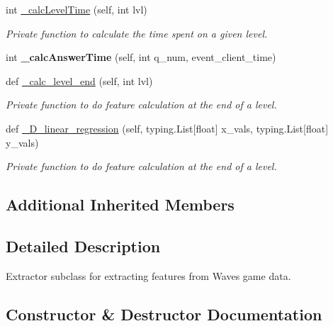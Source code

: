 \begin{DoxyCompactItemize}
int \mbox{\hyperlink{classfeature__extractors_1_1_wave_extractor_1_1_wave_extractor_a3f90f055668095294fd59984e43c11ff}{\+\_\+calc\+Level\+Time}} (self, int lvl)
\begin{DoxyCompactList}\small\item\em Private function to calculate the time spent on a given level. \end{DoxyCompactList}\item 
\mbox{\label{classfeature__extractors_1_1_wave_extractor_1_1_wave_extractor_adc98a43d4cd154ff1aec09b3ff04e8a5}} 
int {\bfseries \+\_\+calc\+Answer\+Time} (self, int q\+\_\+num, event\+\_\+client\+\_\+time)
\item 
def \mbox{\hyperlink{classfeature__extractors_1_1_wave_extractor_1_1_wave_extractor_ab6c939253dae530a4e3b5c13e160e5df}{\+\_\+calc\+\_\+level\+\_\+end}} (self, int lvl)
\begin{DoxyCompactList}\small\item\em Private function to do feature calculation at the end of a level. \end{DoxyCompactList}\item 
def \mbox{\hyperlink{classfeature__extractors_1_1_wave_extractor_1_1_wave_extractor_a7b01d3d7fe641a767a4e68f2a6b2808f}{\+\_\+D\+\_\+linear\+\_\+regression}} (self, typing.\+List\mbox{[}float\mbox{]} x\+\_\+vals, typing.\+List\mbox{[}float\mbox{]} y\+\_\+vals)
\begin{DoxyCompactList}\small\item\em Private function to do feature calculation at the end of a level. \end{DoxyCompactList}\end{DoxyCompactItemize}
\subsection*{Additional Inherited Members}


\subsection{Detailed Description}
Extractor subclass for extracting features from Waves game data. 



\subsection{Constructor \& Destructor Documentation}
\mbox{\label{classfeature__extractors_1_1_wave_extractor_1_1_wave_extractor_ad2acd3dec60e43803dc2d5cc49cda58e}} 
